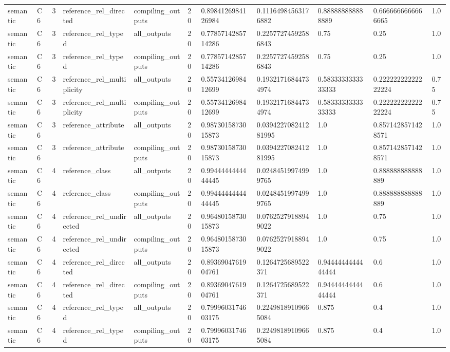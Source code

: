 \begin{tabular}{lllllllllll}
semantic & C6 & 3 & reference\_rel\_directed & compiling\_outputs & 20 & 0.8984126984126984 & 0.11164984563176882 & 0.888888888888889 & 0.6666666666666665 & 1.0 \\
semantic & C6 & 3 & reference\_rel\_typed & all\_outputs & 20 & 0.7785714285714286 & 0.22577274592586843 & 0.75 & 0.25 & 1.0 \\
semantic & C6 & 3 & reference\_rel\_typed & compiling\_outputs & 20 & 0.7785714285714286 & 0.22577274592586843 & 0.75 & 0.25 & 1.0 \\
semantic & C6 & 3 & reference\_rel\_multiplicity & all\_outputs & 20 & 0.5573412698412699 & 0.19321716844734974 & 0.5833333333333333 & 0.22222222222222224 & 0.75 \\
semantic & C6 & 3 & reference\_rel\_multiplicity & compiling\_outputs & 20 & 0.5573412698412699 & 0.19321716844734974 & 0.5833333333333333 & 0.22222222222222224 & 0.75 \\
semantic & C6 & 3 & reference\_attribute & all\_outputs & 20 & 0.9873015873015873 & 0.039422708241281995 & 1.0 & 0.8571428571428571 & 1.0 \\
semantic & C6 & 3 & reference\_attribute & compiling\_outputs & 20 & 0.9873015873015873 & 0.039422708241281995 & 1.0 & 0.8571428571428571 & 1.0 \\
semantic & C6 & 4 & reference\_class & all\_outputs & 20 & 0.9944444444444445 & 0.02484519974999765 & 1.0 & 0.888888888888889 & 1.0 \\
semantic & C6 & 4 & reference\_class & compiling\_outputs & 20 & 0.9944444444444445 & 0.02484519974999765 & 1.0 & 0.888888888888889 & 1.0 \\
semantic & C6 & 4 & reference\_rel\_undirected & all\_outputs & 20 & 0.9648015873015873 & 0.07625279188949022 & 1.0 & 0.75 & 1.0 \\
semantic & C6 & 4 & reference\_rel\_undirected & compiling\_outputs & 20 & 0.9648015873015873 & 0.07625279188949022 & 1.0 & 0.75 & 1.0 \\
semantic & C6 & 4 & reference\_rel\_directed & all\_outputs & 20 & 0.8936904761904761 & 0.1264725689522371 & 0.9444444444444444 & 0.6 & 1.0 \\
semantic & C6 & 4 & reference\_rel\_directed & compiling\_outputs & 20 & 0.8936904761904761 & 0.1264725689522371 & 0.9444444444444444 & 0.6 & 1.0 \\
semantic & C6 & 4 & reference\_rel\_typed & all\_outputs & 20 & 0.7999603174603175 & 0.22498189109665084 & 0.875 & 0.4 & 1.0 \\
semantic & C6 & 4 & reference\_rel\_typed & compiling\_outputs & 20 & 0.7999603174603175 & 0.22498189109665084 & 0.875 & 0.4 & 1.0 \\

\end{tabular}
